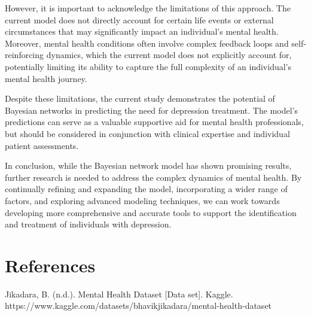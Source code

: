 \documentclass[conference]{IEEEtran}
\begin{document}
However, it is important to acknowledge the limitations of this approach. The current model does not directly account for certain life events or external circumstances that may significantly impact an individual's mental health. Moreover, mental health conditions often involve complex feedback loops and self-reinforcing dynamics, which the current model does not explicitly account for, potentially limiting its ability to capture the full complexity of an individual's mental health journey.

Despite these limitations, the current study demonstrates the potential of Bayesian networks in predicting the need for depression treatment. The model's predictions can serve as a valuable supportive aid for mental health professionals, but should be considered in conjunction with clinical expertise and individual patient assessments.

In conclusion, while the Bayesian network model has shown promising results, further research is needed to address the complex dynamics of mental health. By continually refining and expanding the model, incorporating a wider range of factors, and exploring advanced modeling techniques, we can work towards developing more comprehensive and accurate tools to support the identification and treatment of individuals with depression.
\section*{References}
Jikadara, B. (n.d.). Mental Health Dataset [Data set]. Kaggle. https://www.kaggle.com/datasets/bhavikjikadara/mental-health-dataset
\end{document}
